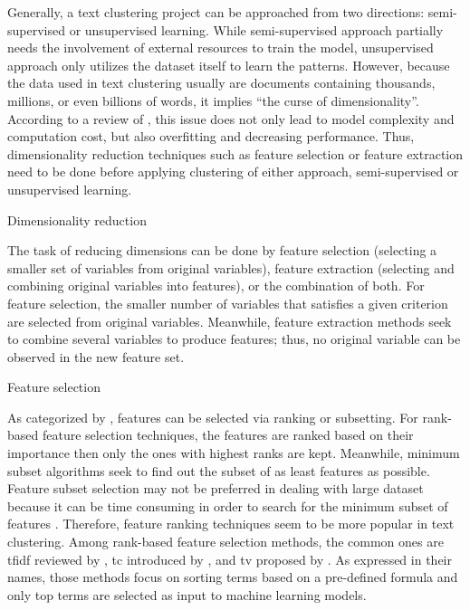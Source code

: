 \documentclass[a4paper,man,floatsintext,natbib,noextraspace]{apa6}
\makeatletter
\renewcommand{\subsection}{\@startsection{subsection}{2}
  {\z@}
  {\b@level@two@skip}
  {\e@level@two@skip}
  {\normalfont\normalsize\bfseries}}
\renewcommand{\subsubsection}{\@startsection{subsubsection}{3}
  {\z@}
  {\b@level@two@skip}
  {\e@level@two@skip}
  {\normalfont\normalsize\bfseries\itshape}}
\makeatother
\begin{document}
Generally, a text clustering project can be approached from two directions: semi-supervised or unsupervised learning. While semi-supervised approach partially needs the involvement of external resources to train the model, unsupervised approach only utilizes the dataset itself to learn the patterns. However, because the data used in text clustering usually are documents containing thousands, millions, or even billions of words, it implies “the curse of dimensionality”. According to a review of \cite{alelyaniFeatureSelectionClustering2013}, this issue does not only lead to model complexity and computation cost, but also overfitting and decreasing performance. Thus, dimensionality reduction techniques such as feature selection or feature extraction need to be done before applying clustering of either approach, semi-supervised or unsupervised learning.

\subsection{Dimensionality reduction}

The task of reducing dimensions can be done by feature selection (selecting a smaller set of variables from original variables), feature extraction (selecting and combining original variables into features), or the combination of both. For feature selection, the smaller number of variables that satisfies a given criterion are selected from original variables. Meanwhile, feature extraction methods seek to combine several variables to produce features; thus, no original variable can be observed in the new feature set.

\subsubsection{Feature selection} 

As categorized by \cite{liuIntegratingFeatureSelection2005}, features can be selected via ranking or subsetting. For rank-based feature selection techniques, the features are ranked based on their importance then only the ones with highest ranks are kept. Meanwhile, minimum subset algorithms seek to find out the subset of as least features as possible. Feature subset selection may not be preferred in dealing with large dataset because it can be time consuming in order to search for the minimum subset of features \citep{alelyaniFeatureSelectionClustering2013}. Therefore, feature ranking techniques seem to be more popular in text clustering. Among rank-based feature selection methods, the common ones are \gls{tfidf} reviewed by \cite{liuComparativeStudyUnsupervised2005}, \gls{tc} introduced by \cite{liuEvaluationFeatureSelection2003}, and \gls{tv} proposed by \cite{liuComparativeStudyUnsupervised2005}. As expressed in their names, those methods focus on sorting terms based on a pre-defined formula and only top terms are selected as input to machine learning models.
\end{document}
